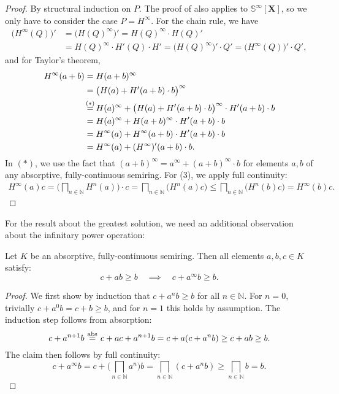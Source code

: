 \documentclass[english,runningheads,a4paper,envcountsame]{llncs}
\newcommand{\Inf}{\bigsqcap}
\newcommand{\Nat}{\mathbb{N}}
\newcommand{\Sinf}{{\mathbb S}^{\infty}}
\newcommand*{\XX}{{\bm X}}
\newcommand{\eqInfo}[1]{\overset{\clap{\scriptsize #1}}{=}}
\newcommand{\eqStar}{\eqInfo{$(*)$}}
\begin{document}
\begin{proof}
By structural induction on $P$.
The proof of \cite{Kleene} also applies to $\Sinf[\XX]$, so we only have to consider the case $P=H^\infty$.
For the chain rule, we have
\begin{align*}
    \big(H^\infty(Q)\big)' &=
    \big(H(Q)^\infty\big)' =
    H(Q)^\infty \cdot H(Q)' \\ &= 
    H(Q)^\infty \cdot H'(Q) \cdot H' =
    \big(H(Q)^\infty\big)' \cdot Q' =
    \big(H^\infty(Q)\big)' \cdot Q',
\end{align*}
and for Taylor's theorem,
\begin{align*}
    H^\infty(a+b) &=
    H(a+b)^\infty \\ &=
    \big( H(a) + H'(a+b) \cdot b \big)^\infty \\ &\eqStar
    H(a)^\infty + \big(H(a) + H'(a+b) \cdot b \big)^\infty \cdot H'(a+b) \cdot b \\ &=
    H(a)^\infty + H(a+b)^\infty \cdot H'(a+b) \cdot b \\ &=
    H^\infty(a) + H^\infty(a+b) \cdot H'(a+b) \cdot b \\ &=
    H^\infty(a) + (H^\infty)'(a+b) \cdot b.
\end{align*}
In $(*)$, we use the fact that $(a+b)^\infty = a^\infty + (a+b)^\infty \cdot b$ for elements $a,b$ of any absorptive, fully-continuous semiring.
For (3), we apply full continuity:
\begin{align*}
  H^\infty(a)c =
  \Big( \Inf_{n \in \Nat} H^n(a) \Big) \cdot c =
  \Inf_{n \in \Nat} \big( H^n(a) c \big) \le
  \Inf_{n \in \Nat} \big( H^n(b) c \big) = H^\infty(b)c. \tag*{\qed}
\end{align*}
\end{proof}

For the result about the greatest solution, we need an additional observation about the infinitary power operation: 

\begin{lemma}\label{lemInfpowIndProof}
Let $K$ be an absorptive, fully-continuous semiring.
Then all elements $a,b,c \in K$ satisfy:
\[
    c + ab \ge b \quad\implies\quad
    c + a^\infty b \ge b.
\]
\end{lemma}
\begin{proof}
We first show by induction that $c + a^nb \ge b$ for all $n \in \Nat$.
For $n=0$, trivially $c + a^0b = c+b \ge b$, and for $n=1$ this holds by assumption.
The induction step follows from absorption:
\[
  c + a^{n+1}b \;\eqInfo{abs}\; c + ac + a^{n+1}b = c + a(c+a^nb) \ge c + ab \ge b.
\]
The claim then follows by full continuity:
\[
  c + a^\infty b = c + \Big(\Inf_{n \in \Nat} a^n\Big)b = \Inf_{n \in \Nat} (c+a^nb) \ge \Inf_{n \in \Nat} b = b. \tag*{\qed}
\]
\end{proof}
\end{document}
